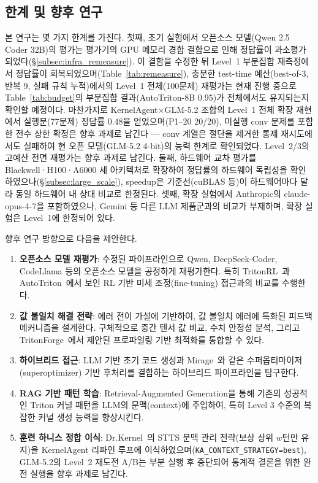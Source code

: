 \documentclass[sigplan,screen,review,anonymous]{acmart}
\begin{document}
\subsection{한계 및 향후 연구}
\label{subsec:limitations}

본 연구는 몇 가지 한계를 가진다. 첫째, 초기 실험에서 오픈소스 모델(Qwen 2.5 Coder 32B)의 평가는 평가기의 GPU 메모리 경합 결함으로 인해 정답률이 과소평가되었다(\S\ref{subsec:infra_remeasure}). 이 결함을 수정한 뒤 Level~1 부분집합 재측정에서 정답률이 회복되었으며(Table~\ref{tab:remeasure}), 충분한 test-time 예산(best-of-3, 반복 9, 실패 규칙 누적)에서의 Level~1 전체(100문제) 재평가는 현재 진행 중으로 Table~\ref{tab:budget}의 부분집합 결과(AutoTriton-8B 0.95)가 전체에서도 유지되는지 확인할 예정이다. 마찬가지로 KernelAgent$\times$GLM-5.2 조합의 Level~1 전체 확장 재현에서 실행분(77문제) 정답률 0.48을 얻었으며(P1--20 20/20), 미실행 conv 문제를 포함한 전수 상한 확정은 향후 과제로 남긴다 --- conv 계열은 절단을 제거한 통제 재시도에서도 실패하여 현 오픈 모델(GLM-5.2 4-bit)의 능력 한계로 확인되었다. Level~2/3의 고예산 전면 재평가는 향후 과제로 남긴다. 둘째, 하드웨어 교차 평가를 Blackwell·H100·A6000 세 아키텍처로 확장하여 정답률의 하드웨어 독립성을 확인하였으나(\S\ref{subsec:large_scale}), speedup은 기준선(cuBLAS 등)이 하드웨어마다 달라 동일 하드웨어 내 상대 비교로 한정된다. 셋째, 확장 실험에서 Anthropic의 claude-opus-4-7을 포함하였으나, Gemini 등 다른 LLM 제품군과의 비교가 부재하며, 확장 실험은 Level~1에 한정되어 있다.

향후 연구 방향으로 다음을 제안한다.
\begin{enumerate}
    \item \textbf{오픈소스 모델 재평가}: 수정된 파이프라인으로 Qwen, DeepSeek-Coder, CodeLlama 등의 오픈소스 모델을 공정하게 재평가한다. 특히 TritonRL~\cite{woo2025tritonrl}과 AutoTriton~\cite{li2025autotriton}에서 보인 RL 기반 미세 조정(fine-tuning) 접근과의 비교를 수행한다.
    \item \textbf{값 불일치 해결 전략}: 에러 전이 가설에 기반하여, 값 불일치 에러에 특화된 피드백 메커니즘을 설계한다. 구체적으로 중간 텐서 값 비교, 수치 안정성 분석, 그리고 TritonForge~\cite{li2025tritonforge}에서 제안된 프로파일링 기반 최적화를 통합할 수 있다.
    \item \textbf{하이브리드 접근}: LLM 기반 초기 코드 생성과 Mirage~\cite{wu2025mirage}와 같은 수퍼옵티마이저(superoptimizer) 기반 후처리를 결합하는 하이브리드 파이프라인을 탐구한다.
    \item \textbf{RAG 기반 패턴 학습}: Retrieval-Augmented Generation을 통해 기존의 성공적인 Triton 커널 패턴을 LLM의 문맥(context)에 주입하여, 특히 Level 3 수준의 복잡한 커널 생성 능력을 향상시킨다.
    \item \textbf{훈련 하니스 정합 이식}: Dr.Kernel~\cite{drkernel2026}의 STTS 문맥 관리 전략(보상 상위 $w$턴만 유지)을 KernelAgent 리파인 루프에 이식하였으며(\texttt{KA\_CONTEXT\_STRATEGY=best}), GLM-5.2의 Level~2 재도전 A/B는 부분 실행 후 중단되어 통계적 결론을 위한 완전 실행을 향후 과제로 남긴다.
\end{enumerate}
\end{document}
